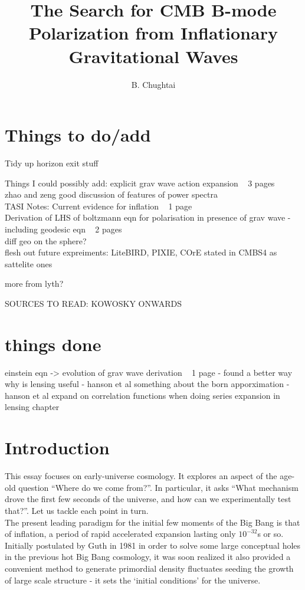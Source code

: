 \documentclass[a4paper,10pt]{article}
\title{\boldmath The Search for CMB B-mode Polarization from Inflationary Gravitational Waves}
\author{B. Chughtai}
\affiliation{University of Cambridge, Cambridge, UK}
\begin{document}
\maketitle
\flushbottom

\section{Things to do/add}

Tidy up horizon exit stuff

Things I could possibly add:
explicit grav wave action expansion ~ 3 pages \\
zhao and zeng good discussion of features of power spectra\\
TASI Notes: Current evidence for inflation ~ 1 page\\
Derivation of LHS of boltzmann eqn for polarisation in presence of grav wave - including geodesic eqn ~ 2 pages\\
diff geo on the sphere?\\





flesh out future expreiments: LiteBIRD, PIXIE, COrE stated in CMBS4 as sattelite ones

more from lyth?


SOURCES TO READ: KOWOSKY ONWARDS




\section{things done}
einstein eqn -> evolution of grav wave derivation ~ 1 page - found a better way
why is lensing useful - hanson et al
something about the born apporximation	 - hanson et al
expand on correlation functions when doing series expansion in lensing chapter

\section{Introduction}


This essay focuses on early-universe cosmology. It explores an aspect of the age-old question ``Where do we come from?''. In particular, it asks ``What mechanism drove the first few seconds of the universe, and how can we experimentally test that?''. Let us tackle each point in turn.\\

The present leading paradigm for the initial few moments of the Big Bang is that of inflation, a period of rapid accelerated expansion lasting only $10^{-32}$s or so. Initially postulated by Guth in 1981 \cite{Guth} in order to solve some large conceptual holes in the previous hot Big Bang cosmology, it was soon realized it also provided a convenient method to generate primordial density fluctuates seeding the growth of large scale structure - it sets the `initial conditions' for the universe. \\
\end{document}
